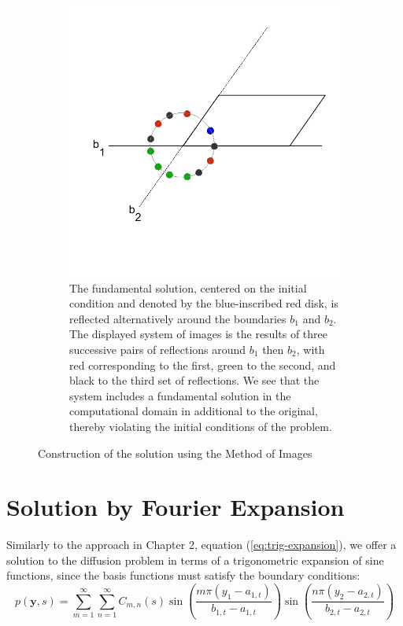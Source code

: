 \begin{figure}[htbp]
\begin{subfigure}[t]{0.4\textwidth}
                \includegraphics[width=\textwidth]{./chapter-3-two-dimensional-case/transformed-reflection.pdf}
                \caption{The fundamental solution, centered on the initial condition and denoted by the blue-inscribed red disk, is reflected alternatively around the boundaries $b_1$ and $b_2$. The displayed system of images is the results of three successive pairs of reflections around $b_1$ then $b_2$, with red corresponding to the first, green to the second, and black to the third set of reflections. We see that the system includes a fundamental solution in the computational domain in additional to the original, thereby violating the initial conditions of the problem. }
                \label{fig:transformed-reflection}
        \end{subfigure}
        
        \caption{Construction of the solution using the Method of Images}\label{fig:animals}
\end{figure}

\section{Solution by Fourier Expansion}
Similarly to the approach in Chapter 2, equation (\ref{eq:trig-expansion}), we offer a solution to the diffusion problem in terms of a trigonometric expansion of sine functions, since the basis functions must satisfy the boundary conditions:
\begin{equation}
	p(\mathbf{y}, s) = \sum_{m=1}^\infty \sum_{n=1}^\infty C_{m,n}(s) \sin\left( \frac{m \pi (y_1 - a_{1,t})}{b_{1,t} - a_{1,t}} \right) \sin\left( \frac{n \pi (y_2 - a_{2,t})}{b_{2,t} - a_{2,t}} \right)
\end{equation}	


